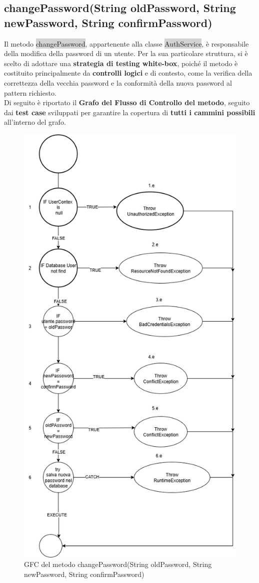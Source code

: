 \subsection{changePassword(String oldPassword, String newPassword, String confirmPassword)}

Il metodo \colorbox{lightgray}{changePassword}, appartenente alla classe \colorbox{lightgray}{AuthService}, è responsabile della modifica della password di un utente. Per la sua particolare struttura, si è scelto di adottare una \textbf{strategia di testing white-box}, poiché il metodo è costituito principalmente da \textbf{controlli logici} e di contesto, come la verifica della correttezza della vecchia password e la conformità della nuova password al pattern richiesto.
\\
Di seguito è riportato il \textbf{Grafo del Flusso di Controllo del metodo}, seguito dai \textbf{test case} sviluppati per garantire la copertura di \textbf{tutti i cammini possibili} all’interno del grafo.

\begin{figure}[H]
	\centering
	\includegraphics[width=0.7\linewidth]{Immagini/unit test/grafoCambiaPassword.png}
	\caption[GFC changePassword]{GFC del metodo changePassword(String oldPassword, String newPassword, String confirmPassword)}
\end{figure}

